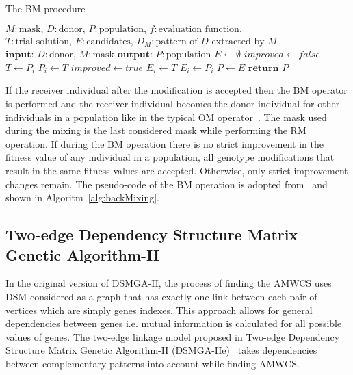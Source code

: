 \begin{algorithm}
	\caption{The BM procedure}
	\label{alg:backMixing}
	\begin{algorithmic}[1]
		\State $M: \text{mask, } D: \text{donor, } P: \text{population, } f: \text{evaluation function,}$
		\State $T: \text{trial solution, } E: \text{candidates,}$
		\State $D_M: \text{pattern of $D$ extracted by $M$}$
		\State $\textbf{input: } D: \text{donor, } M: \text{mask}$
		\State $\textbf{output: } P: \text{population}$
		\State $E \gets \emptyset$
		\State $improved \gets false$
			\State $T \gets P_i$
			\State {}
				\State $P_i \gets T$
				\State $improved \gets true$
			\Else
					\State $E_i \gets T$
				\Else
					\State $E_i \gets P_i$
				\EndIf
			\EndIf
		\EndFor
			\State $P \gets E$
		\EndIf
		\State $\textbf{return } P$
	\end{algorithmic}
\end{algorithm}
If the receiver individual after the modification is accepted then the BM operator is performed and the receiver individual becomes the donor individual for other individuals in a population like in the typical OM operator~\cite{om}. The mask used during the mixing is the last considered mask while performing the RM operation. If during the BM operation there is no strict improvement in the fitness value of any individual in a population, all genotype modifications that result in the same fitness values are accepted. Otherwise, only strict improvement changes remain. The pseudo-code of the BM operation is adopted from~\cite{dsmga2e} and shown in Algoritm~\ref{alg:backMixing}.

\subsection{Two-edge Dependency Structure Matrix Genetic Algorithm-II}

In the original version of DSMGA-II, the process of finding the AMWCS uses DSM considered as a graph that has exactly one link between each pair of vertices which are simply genes indexes. This approach allows for general dependencies between genes i.e. mutual information is calculated for all possible values of genes. The two-edge linkage model proposed in Two-edge Dependency Structure Matrix Genetic Algorithm-II (DSMGA-IIe)~\cite{dsmga2e} takes dependencies between complementary patterns into account while finding AMWCS. 

